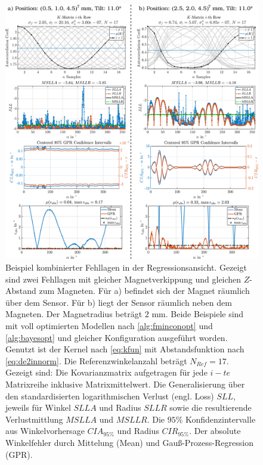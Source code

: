 \clearpage
\begin{figure}[tph]
	\centering
	\includegraphics[width=\linewidth]{chapters/images/4-EuOExp/Kombinierte-Fehllagen-GPR}
	\caption[Beispiel kombinierter Fehllagen in der Regressionsansicht]{Beispiel kombinierter Fehllagen in der Regressionsansicht. Gezeigt sind zwei Fehllagen mit gleicher Magnetverkippung und gleichen $Z$-Abstand zum Magneten. Für a) befindet sich der Magnet räumlich über dem Sensor. Für b) liegt der Sensor räumlich neben dem Magneten. Der Magnetradius beträgt $2$ mm. Beide Beispiele sind mit voll optimierten Modellen nach \autoref{alg:fminconopt} und \autoref{alg:bayesopt} und gleicher Konfiguration ausgeführt worden. Genutzt ist der Kernel nach \autoref{eq:kfun} mit Abstandsfunktion nach \autoref{eq:de2innorm}. Die Referenzwinkelanzahl beträgt $N_{Ref} = 17$. Gezeigt sind: Die Kovarianzmatrix aufgetragen für jede $i-te$ Matrixreihe inklusive Matrixmittelwert. Die Generalisierung über den standardisierten logarithmischen Verlust (engl. Loss) $SLL$, jeweils für Winkel $SLLA$ und Radius $SLLR$ sowie die resultierende Verlustmittlung $MSLLA$ und $MSLLR$. Die $95\%$ Konfidenzintervalle aus Winkelvorhersage $CIA_{95\%}$ und Radius $CIR_{95\%}$. Der absolute Winkelfehler durch Mittelung (Mean) und Gauß-Prozess-Regression (GPR).}
	\label{fig:kombinierte-fehllagen-gpr}
\end{figure}


